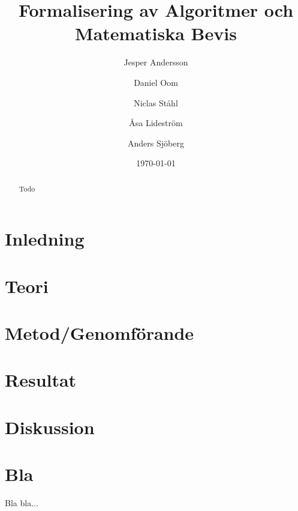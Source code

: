 \documentclass[a4paper]{article}
\title{Formalisering av Algoritmer och Matematiska Bevis}
\author[1]{Jesper Andersson}
\author[1]{Daniel Oom}
\author[1]{Niclas Ståhl}
\author[2]{Åsa Lideström}
\author[2]{Anders Sjöberg}
\affil[1]{Datateknik, Chalmers}
\affil[2]{Mattematik, Göteborgs Universitet}
\date{\today}
\begin{document}
\begin{abstract}
Todo
\end{abstract}

\maketitle
\thispagestyle{empty}
\newpage
\tableofcontents
\newpage

\section{Inledning}

\section{Teori}


\section{Metod/Genomförande}

\section{Resultat}

\section{Diskussion}


\printbibliography

\appendix
\section{Bla}
Bla bla...
\end{document}
